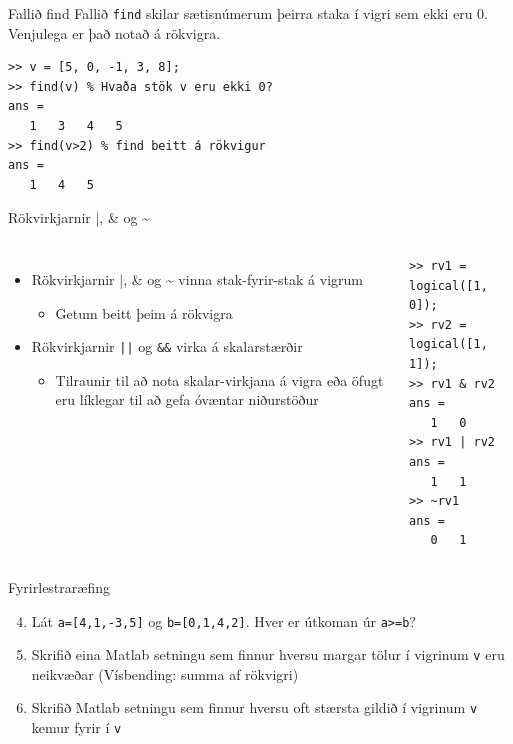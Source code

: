 \documentclass[handout]{beamer}
\begin{document}
\begin{frame}[fragile]{Fallið find}
Fallið \texttt{find} skilar sætisnúmerum þeirra staka í vigri sem ekki eru 0. Venjulega er það notað á rökvigra.
\begin{verbatim}
>> v = [5, 0, -1, 3, 8];
>> find(v) % Hvaða stök v eru ekki 0?
ans =
   1   3   4   5
>> find(v>2) % find beitt á rökvigur
ans =
   1   4   5
\end{verbatim}
\end{frame}

\begin{frame}[fragile]{Rökvirkjarnir |, \& og \~{}}
\vspace{\baselineskip}
\begin{columns}
\begin{itemize}
 \item Rökvirkjarnir |, \& og \~{} vinna stak-fyrir-stak á vigrum
 \begin{itemize}
  \item Getum beitt þeim á rökvigra
 \end{itemize}
 \item Rökvirkjarnir \texttt{||} og \texttt{\&\&} virka á skalarstærðir
 \begin{itemize}
  \item Tilraunir til að nota skalar-virkjana á vigra eða öfugt eru líklegar til að gefa óvæntar niðurstöður
 \end{itemize}
\end{itemize}
\begin{verbatim}
>> rv1 = logical([1, 0]);
>> rv2 = logical([1, 1]);
>> rv1 & rv2
ans =
   1   0
>> rv1 | rv2
ans =
   1   1
>> ~rv1
ans =
   0   1
\end{verbatim}
\end{columns}
\end{frame}

\begin{frame}{Fyrirlestraræfing}
\begin{enumerate}
\setcounter{enumi}{3}
 \item Lát  \texttt{a=[4,1,-3,5]}  og   \texttt{b=[0,1,4,2]}. Hver er útkoman úr  \texttt{a>=b}?
 \item Skrifið eina Matlab setningu sem finnur hversu margar tölur í vigrinum \texttt{v} eru neikvæðar (Vísbending: summa af rökvigri)
 \item Skrifið Matlab setningu sem finnur hversu oft stærsta gildið í vigrinum \texttt{v} kemur fyrir í \texttt{v}
\end{enumerate}
\end{frame}
\end{document}
